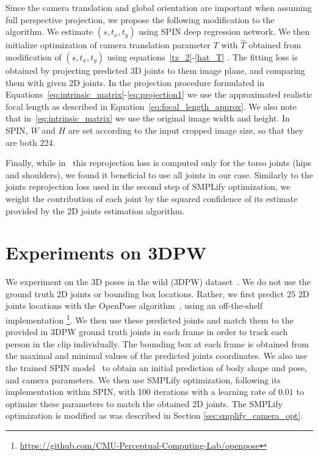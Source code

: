 \documentclass[runningheads]{llncs}
\begin{document}
Since the camera translation and global orientation are important when assuming full perspective projection, we propose the following modification to the algorithm. We estimate $ (s, t_x, t_y) $ using SPIN deep regression network. We then initialize optimization of camera translation parameter $ T $ with $\hat T$ obtained from modification of $ (s, t_x, t_y) $ using equations~\ref{tz_2}-\ref{hat_T} . The fitting loss is obtained by projecting predicted 3D joints to them image plane, and comparing them with given 2D joints. In the projection procedure formulated in Equations~\ref{eq:intrinsic_matrix}-\ref{eq:projection1} we use the approximated realistic focal length as described in Equation~\ref{eq:focal_length_approx}. We also note that in~\ref{eq:intrinsic_matrix} we use the original image width and height. In SPIN, $ W $ and $ H $ are set according to the input cropped image size, so that they are both 224. 

Finally, while in~\cite{kolotouros2019learning}  this reprojection loss is computed only for the torso joints (hips and shoulders), we found it beneficial to use all joints in our case. Similarly to the joints reprojection loss used in the second step of SMPLify optimization, we weight the contribution of each joint by the squared confidence of its estimate provided by the 2D joints estimation algorithm.   


\section{Experiments on 3DPW}

We experiment on the 3D poses in the wild (3DPW) dataset~\cite{vonMarcard2018}. We do not use the ground truth 2D joints or bounding box locations. Rather, we first predict 25 2D joints locations with the OpenPose algorithm~\cite{8765346,cao2017realtime}, using an off-the-shelf implementation \footnote{\href{https://github.com/CMU-Perceptual-Computing-Lab/openpose}{https://github.com/CMU-Perceptual-Computing-Lab/openpose}}. We then use these predicted joints and match them to the provided in 3DPW ground truth joints in each frame in order to track each person in the clip individually. The bounding box at each frame is obtained from the maximal and minimal values of the predicted joints coordinates.
We also use the trained SPIN model~\cite{kolotouros2019learning} to obtain an initial prediction of body shape and pose, and camera parameters. We then use SMPLify optimization, following its implementation within SPIN, with 100 iterations with a learning rate of $ 0.01 $ to optimize these parameters to match the obtained 2D joints. The SMPLify optimization is modified as was described in Section \ref{sec:smplify_camera_opt}. 
\end{document}
